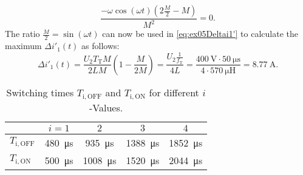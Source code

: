 \begin{solutionblock}
    \begin{equation}
        \frac{-\omega \cos(\omega t)(2 \frac{M}{2}-M)}{M^2}=0.
    \end{equation}
    The ratio $\frac{M}{2}=\sin(\omega t)$ can now be used in \eqref{eq:ex05Deltai1'} to calculate the maximum $\Delta i'_{\mathrm{1}}(t)$ as follows:
    \begin{equation}
        \Delta i'_{\mathrm{1}}(t) = \frac{U_{\mathrm{2}}T_{\mathrm{T}}M}{2LM}\left(1-\frac{M}{2M}\right) = \frac{U_{\mathrm{2}}\frac{1}{f_\mathrm{T}}}{4L}=\frac{\SI{400}{\volt}\cdot \SI{50}{\micro\s}}{4\cdot\SI{570}{\micro\henry}} = \SI{8.77}{\ampere}.
    \end{equation}
\end{solutionblock}


\begin{table}[ht]
    \centering
    
    \begin{tabular}{lcccc}
        \toprule
        & $i = 1$ & $2$ & $3$ & $4$ \\
        \midrule
       $T_\mathrm{i,OFF}$& \SI{480}{\micro\second} & \SI{935}{\micro\second} & \SI{1388}{\micro\second} & \SI{1852}{\micro\second} \\
        $T_\mathrm{i,ON}$  & \SI{500}{\micro\second} & \SI{1008}{\micro\second} & \SI{1520}{\micro\second} & \SI{2044}{\micro\second} \\
        \bottomrule
    \end{tabular}
    \caption{Switching times $T_\mathrm{i,OFF}$ and $T_\mathrm{i,ON}$ for different $i$-Values.}
    \label{tab:switching_times}
\end{table}

